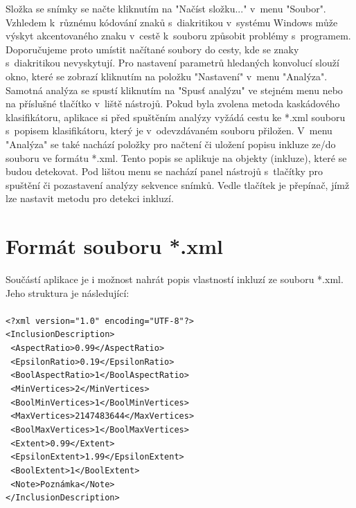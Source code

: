 \documentclass[12pt, a4paper]{report}
\begin{document}
Složka se snímky se načte kliknutím na "Načíst složku..." v~menu "Soubor". Vzhledem k~různému kódování znaků s~diakritikou v~systému Windows může výskyt akcentovaného znaku v~cestě k~souboru způsobit problémy s~programem. Doporučujeme proto umístit načítané soubory do cesty, kde se znaky s~diakritikou nevyskytují. Pro nastavení parametrů hledaných konvolucí slouží okno, které se zobrazí kliknutím na položku "Nastavení" v~menu "Analýza". Samotná analýza se spustí kliknutím na "Spusť analýzu" ve stejném menu nebo na příslušné tlačítko v~liště nástrojů. Pokud byla zvolena metoda kaskádového klasifikátoru, aplikace si před spuštěním analýzy vyžádá cestu ke *.xml souboru s~popisem klasifikátoru, který je v~odevzdávaném souboru přiložen. V~menu "Analýza" se také nachází položky pro načtení či uložení popisu inkluze ze/do souboru ve formátu *.xml. Tento popis se aplikuje na objekty (inkluze), které se budou detekovat. Pod lištou menu se nachází panel nástrojů s~tlačítky pro spuštění či pozastavení analýzy sekvence snímků. Vedle tlačítek je přepínač, jímž lze nastavit metodu pro detekci inkluzí.

	\section{Formát souboru *.xml}
	Součástí aplikace je i možnost nahrát popis vlastností inkluzí ze souboru *.xml. Jeho struktura je následující:\\
	\\
\texttt{<?xml version="1.0" encoding="UTF-8"?>}\\
\texttt{<InclusionDescription>}\\
	\texttt{	<AspectRatio>0.99</AspectRatio>}\\
    \texttt{	<EpsilonRatio>0.19</EpsilonRatio>}\\
    \texttt{	<BoolAspectRatio>1</BoolAspectRatio>}\\
    \texttt{	<MinVertices>2</MinVertices>}\\
    \texttt{	<BoolMinVertices>1</BoolMinVertices>}\\
    \texttt{	<MaxVertices>2147483644</MaxVertices>}\\
    \texttt{	<BoolMaxVertices>1</BoolMaxVertices>}\\
    \texttt{	<Extent>0.99</Extent>}\\
    \texttt{	<EpsilonExtent>1.99</EpsilonExtent>}\\
    \texttt{	<BoolExtent>1</BoolExtent>}\\
    \texttt{	<Note>Poznámka</Note>}\\
\texttt{</InclusionDescription>}\\
\end{document}

